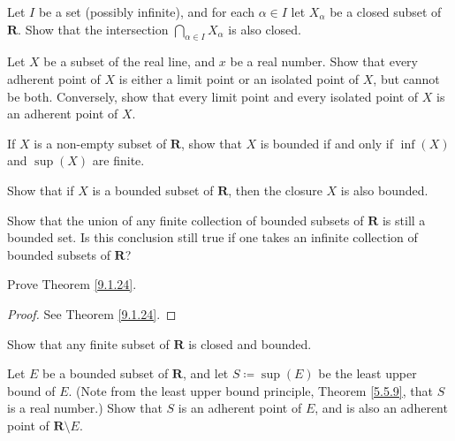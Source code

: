 \begin{exercise}\label{ex 9.1.8}
    Let \(I\) be a set (possibly infinite), and for each \(\alpha \in I\) let \(X_{\alpha}\) be a closed subset of \(\mathbf{R}\).
    Show that the intersection \(\bigcap_{\alpha \in I} X_{\alpha}\) is also closed.
\end{exercise}

\begin{exercise}\label{ex 9.1.9}
    Let \(X\) be a subset of the real line, and \(x\) be a real number.
    Show that every adherent point of \(X\) is either a limit point or an isolated point of \(X\), but cannot be both.
    Conversely, show that every limit point and every isolated point of \(X\) is an adherent point of \(X\).
\end{exercise}

\begin{exercise}\label{ex 9.1.10}
    If \(X\) is a non-empty subset of \(\mathbf{R}\), show that \(X\) is bounded if and only if \(\inf(X)\) and \(\sup(X)\) are finite.
\end{exercise}

\begin{exercise}\label{ex 9.1.11}
    Show that if \(X\) is a bounded subset of \(\mathbf{R}\), then the closure \(X\) is also bounded.
\end{exercise}

\begin{exercise}\label{ex 9.1.12}
    Show that the union of any finite collection of bounded subsets of \(\mathbf{R}\) is still a bounded set.
    Is this conclusion still true if one takes an infinite collection of bounded subsets of \(\mathbf{R}\)?
\end{exercise}

\begin{exercise}\label{ex 9.1.13}
    Prove Theorem \ref{9.1.24}.
\end{exercise}

\begin{proof}
    See Theorem \ref{9.1.24}.
\end{proof}

\begin{exercise}\label{ex 9.1.14}
    Show that any finite subset of \(\mathbf{R}\) is closed and bounded.
\end{exercise}

\begin{exercise}\label{ex 9.1.15}
    Let \(E\) be a bounded subset of \(\mathbf{R}\), and let \(S \coloneqq \sup(E)\) be the least upper bound of \(E\).
    (Note from the least upper bound principle, Theorem \ref{5.5.9}, that \(S\) is a real number.)
    Show that \(S\) is an adherent point of \(E\), and is also an adherent point of \(\mathbf{R} \setminus E\).
\end{exercise}